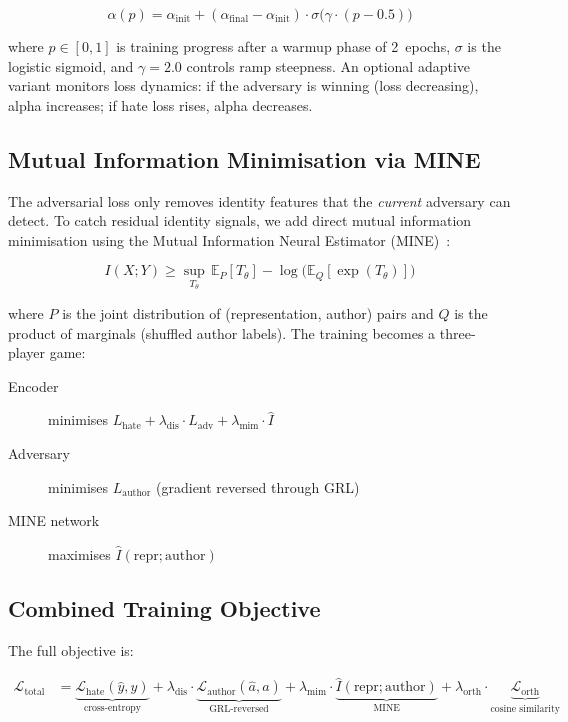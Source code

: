 \documentclass{article}
\begin{document}
\begin{equation}
\label{eq:agrs}
\alpha(p) = \alpha_{\text{init}} + (\alpha_{\text{final}} - \alpha_{\text{init}})
\cdot \sigma\big(\gamma \cdot (p - 0.5)\big)
\end{equation}

\noindent
where $p \in [0,1]$ is training progress after a warmup phase of 2~epochs,
$\sigma$ is the logistic sigmoid, and $\gamma=2.0$ controls ramp steepness.
An optional adaptive variant monitors loss dynamics: if the adversary is
winning (loss decreasing), alpha increases; if hate loss rises,
alpha decreases.

\subsection{Mutual Information Minimisation via MINE}

The adversarial loss only removes identity features that the
\emph{current} adversary can detect. To catch residual identity signals,
we add direct mutual information minimisation using the Mutual
Information Neural Estimator (MINE)~\cite{belghazi2018mine}:

\begin{equation}
\label{eq:mine}
I(X;Y) \geq \sup_{T_\theta} \,
\mathbb{E}_{P}[T_\theta] - \log\big(\mathbb{E}_{Q}[\exp(T_\theta)]\big)
\end{equation}

\noindent
where $P$ is the joint distribution of (representation, author) pairs
and $Q$ is the product of marginals (shuffled author labels).
The training becomes a three-player game:
\begin{description}
  \item[Encoder] minimises $L_{\text{hate}} + \lambda_{\text{dis}} \cdot L_{\text{adv}}
        + \lambda_{\text{mim}} \cdot \hat{I}$
  \item[Adversary] minimises $L_{\text{author}}$ (gradient reversed through GRL)
  \item[MINE network] maximises $\hat{I}(\text{repr}; \text{author})$
\end{description}

\subsection{Combined Training Objective}

The full objective is:

\begin{align}
\label{eq:objective}
\mathcal{L}_{\text{total}} &=
\underbrace{\mathcal{L}_{\text{hate}}(\hat{y}, y)}_{\text{cross-entropy}}
+ \lambda_{\text{dis}} \cdot \underbrace{\mathcal{L}_{\text{author}}(\hat{a}, a)}_{\text{GRL-reversed}}
+ \lambda_{\text{mim}} \cdot \underbrace{\hat{I}(\text{repr}; \text{author})}_{\text{MINE}}
+ \lambda_{\text{orth}} \cdot \underbrace{\mathcal{L}_{\text{orth}}}_{\text{cosine similarity}}
\end{align}
\end{document}
